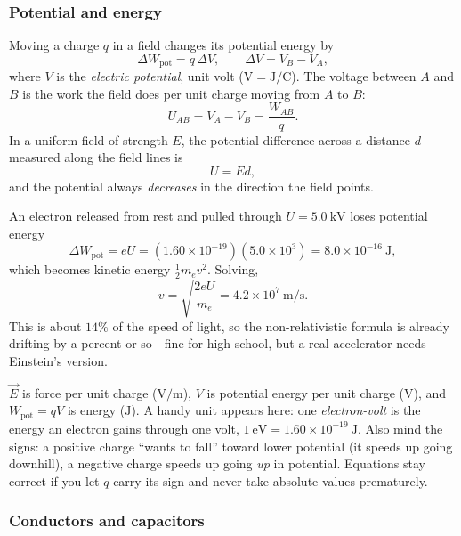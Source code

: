 \subsubsection{Potential and energy}

\begin{definition}\label{def:potential}
Moving a charge $q$ in a field changes its potential energy by
\[
  \Delta W_\text{pot} = q\,\Delta V, \qquad \Delta V = V_B - V_A,
\]
where $V$ is the \emph{electric potential}, unit volt ($\mathrm{V} = \mathrm{J/C}$). The voltage between $A$ and $B$ is the work the field does per unit charge moving from $A$ to $B$:
\[
  U_{AB} = V_A - V_B = \frac{W_{AB}}{q}.
\]
In a uniform field of strength $E$, the potential difference across a distance $d$ measured along the field lines is
\[
  U = E d,
\]
and the potential always \emph{decreases} in the direction the field points.
\end{definition}

\begin{example}\label{exm:electron-kv}
An electron released from rest and pulled through $U = 5.0\ \mathrm{kV}$ loses potential energy
\[
  \Delta W_\text{pot} = eU = (1.60\times 10^{-19})(5.0\times 10^{3}) = 8.0\times 10^{-16}\ \mathrm{J},
\]
which becomes kinetic energy $\tfrac{1}{2}m_e v^2$. Solving,
\[
  v = \sqrt{\frac{2eU}{m_e}} = 4.2\times 10^{7}\ \mathrm{m/s}.
\]
This is about $14\%$ of the speed of light, so the non-relativistic formula is already drifting by a percent or so---fine for high school, but a real accelerator needs Einstein's version.
\end{example}

\begin{remark}\label{rmk:potential-confusions}
$\vec{E}$ is force per unit charge ($\mathrm{V/m}$), $V$ is potential energy per unit charge ($\mathrm{V}$), and $W_\text{pot} = qV$ is energy ($\mathrm{J}$). A handy unit appears here: one \emph{electron-volt} is the energy an electron gains through one volt, $1\ \mathrm{eV} = 1.60\times 10^{-19}\ \mathrm{J}$. Also mind the signs: a positive charge ``wants to fall'' toward lower potential (it speeds up going downhill), a negative charge speeds up going \emph{up} in potential. Equations stay correct if you let $q$ carry its sign and never take absolute values prematurely.
\end{remark}

\subsubsection{Conductors and capacitors}

